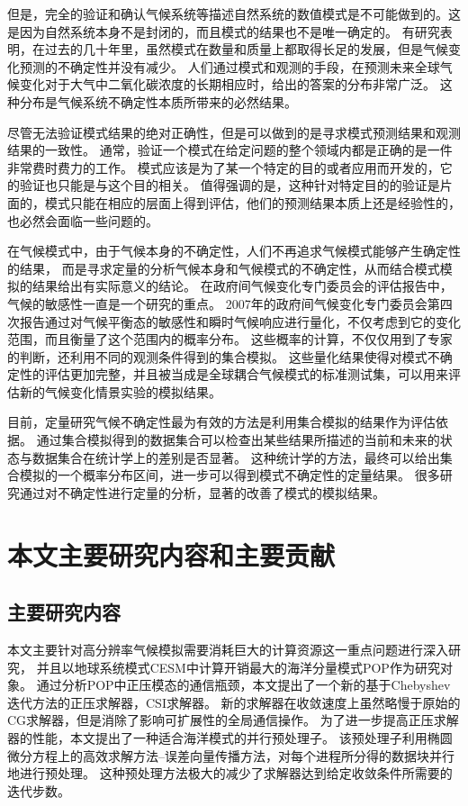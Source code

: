 但是，完全的验证和确认气候系统等描述自然系统的数值模式是不可能做到的。这是因为自然系统本身不是封闭的，而且模式的结果也不是唯一确定的\cite{oreskes1994verification}。
有研究表明，在过去的几十年里，虽然模式在数量和质量上都取得长足的发展，但是气候变化预测的不确定性并没有减少。 
人们通过模式和观测的手段，在预测未来全球气候变化对于大气中二氧化碳浓度的长期相应时，给出的答案的分布非常广泛。
这种分布是气候系统不确定性本质所带来的必然结果\cite{roe2007climate}。 

尽管无法验证模式结果的绝对正确性，但是可以做到的是寻求模式预测结果和观测结果的一致性。
通常，验证一个模式在给定问题的整个领域内都是正确的是一件非常费时费力的工作。  
模式应该是为了某一个特定的目的或者应用而开发的，它的验证也只能是与这个目的相关\cite{sargent2005verification}。
值得强调的是，这种针对特定目的的验证是片面的，模式只能在相应的层面上得到评估，他们的预测结果本质上还是经验性的，也必然会面临一些问题的。


在气候模式中，由于气候本身的不确定性，人们不再追求气候模式能够产生确定性的结果，
而是寻求定量的分析气候本身和气候模式的不确定性，从而结合模式模拟的结果给出有实际意义的结论。
在政府间气候变化专门委员会的评估报告中，气候的敏感性一直是一个研究的重点。
2007年的政府间气候变化专门委员会第四次报告通过对气候平衡态的敏感性和瞬时气候响应进行量化，不仅考虑到它的变化范围，而且衡量了这个范围内的概率分布。
这些概率的计算，不仅仅用到了专家的判断，还利用不同的观测条件得到的集合模拟。 
这些量化结果使得对模式不确定性的评估更加完整，并且被当成是全球耦合气候模式的标准测试集，可以用来评估新的气候变化情景实验的模拟结果\cite{meehl2007global}。 
 
目前，定量研究气候不确定性最为有效的方法是利用集合模拟的结果作为评估依据\cite{von2013testing,reynolds1994random, allen2002towards}。
通过集合模拟得到的数据集合可以检查出某些结果所描述的当前和未来的状态与数据集合在统计学上的差别是否显著。
这种统计学的方法，最终可以给出集合模拟的一个概率分布区间，进一步可以得到模式不确定性的定量结果。
很多研究通过对不确定性进行定量的分析，显著的改善了模式的模拟结果\cite{reynolds1994random}。


\section{本文主要研究内容和主要贡献}
\subsection{主要研究内容}
本文主要针对高分辨率气候模拟需要消耗巨大的计算资源这一重点问题进行深入研究，
并且以地球系统模式CESM中计算开销最大的海洋分量模式POP作为研究对象。
通过分析POP中正压模态的通信瓶颈，本文提出了一个新的基于Chebyshev迭代方法的正压求解器，CSI求解器。
新的求解器在收敛速度上虽然略慢于原始的CG求解器，但是消除了影响可扩展性的全局通信操作。
为了进一步提高正压求解器的性能，本文提出了一种适合海洋模式的并行预处理子。 
该预处理子利用椭圆微分方程上的高效求解方法--误差向量传播方法，对每个进程所分得的数据块并行地进行预处理。 
这种预处理方法极大的减少了求解器达到给定收敛条件所需要的迭代步数。

